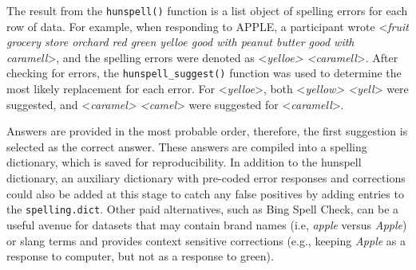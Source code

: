 \documentclass[man]{apa6}
\newenvironment{Shaded}{\begin{snugshade}}{\end{snugshade}}
\newcommand{\CommentTok}[1]{\textcolor[rgb]{0.56,0.35,0.01}{\textit{#1}}}
\newcommand{\DataTypeTok}[1]{\textcolor[rgb]{0.13,0.29,0.53}{#1}}
\newcommand{\KeywordTok}[1]{\textcolor[rgb]{0.13,0.29,0.53}{\textbf{#1}}}
\newcommand{\NormalTok}[1]{#1}
\newcommand{\OperatorTok}[1]{\textcolor[rgb]{0.81,0.36,0.00}{\textbf{#1}}}
\newcommand{\StringTok}[1]{\textcolor[rgb]{0.31,0.60,0.02}{#1}}
\begin{document}
\scriptsize

\begin{Shaded}
\end{Shaded}

\normalsize

The result from the \texttt{hunspell()} function is a list object of spelling errors for each row of data. For example, when responding to APPLE, a participant wrote \textless{}\emph{fruit grocery store orchard red green yelloe good with peanut butter good with caramell}\textgreater{}, and the spelling errors were denoted as \textless{}\emph{yelloe\textgreater{} \textless{}caramell}\textgreater{}. After checking for errors, the \texttt{hunspell\_suggest()} function was used to determine the most likely replacement for each error. For \textless{}\emph{yelloe}\textgreater{}, both \textless{}\emph{yellow\textgreater{} \textless{}yell}\textgreater{} were suggested, and \textless{}\emph{caramel\textgreater{} \textless{}camel}\textgreater{} were suggested for \textless{}\emph{caramell}\textgreater{}.

Answers are provided in the most probable order, therefore, the first suggestion is selected as the correct answer. These answers are compiled into a spelling dictionary, which is saved for reproducibility. In addition to the hunspell dictionary, an auxiliary dictionary with pre-coded error responses and corrections could also be added at this stage to catch any false positives by adding entries to the \texttt{spelling.dict}. Other paid alternatives, such as Bing Spell Check, can be a useful avenue for datasets that may contain brand names (i.e, \emph{apple} versus \emph{Apple}) or slang terms and provides context sensitive corrections (e.g., keeping \emph{Apple} as a response to computer, but not as a response to green).
\end{document}
